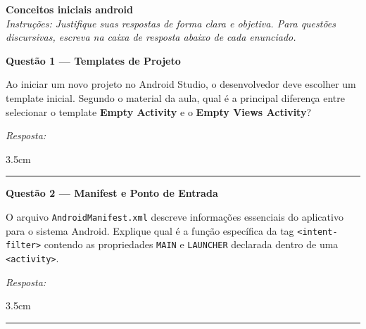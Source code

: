 \documentclass[12pt]{article}
\begin{document}

\vspace*{0.2cm}

\begin{center}
  {\Large \textbf{Conceitos iniciais android}}\\[0.2cm]
  \textit{Instruções: Justifique suas respostas de forma clara e objetiva.
  Para questões discursivas, escreva na caixa de resposta abaixo de cada enunciado.}
\end{center}

\vspace{0.4cm}

\noindent\textbf{Questão 1 — Templates de Projeto}

\vspace{0.2cm}
\noindent
Ao iniciar um novo projeto no Android Studio, o desenvolvedor deve escolher um template inicial. Segundo o material da aula, qual é a principal diferença entre selecionar o template \textbf{Empty Activity} e o \textbf{Empty Views Activity}?

\vspace{0.3cm}
\noindent\textit{Resposta:}
\begin{resposta}{3.5cm}
\end{resposta}

\vspace{0.6cm}
\noindent\rule{\textwidth}{0.8pt}
\vspace{0.3cm}

\noindent\textbf{Questão 2 — Manifest e Ponto de Entrada}

\vspace{0.2cm}
\noindent
O arquivo \texttt{AndroidManifest.xml} descreve informações essenciais do aplicativo para o sistema Android. Explique qual é a função específica da tag \texttt{<intent-filter>} contendo as propriedades \texttt{MAIN} e \texttt{LAUNCHER} declarada dentro de uma \texttt{<activity>}.

\vspace{0.3cm}
\noindent\textit{Resposta:}
\begin{resposta}{3.5cm}
\end{resposta}

\vspace{0.6cm}
\noindent\rule{\textwidth}{0.8pt}
\vspace{0.3cm}
\end{document}
